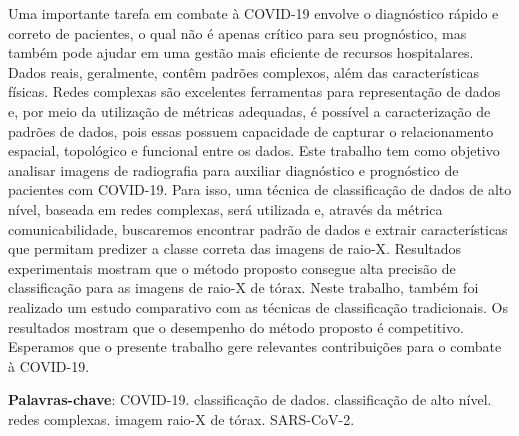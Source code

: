 \documentclass[
12pt,        %
oneside,     %
a4paper,     %
english,       %
brazil        %
%
%
]{ppgca}
\begin{document}

\setlength{\absparsep}{18pt} %
\begin{resumo}
\noindent
  Uma importante tarefa em combate à COVID-19 envolve o diagnóstico rápido e correto de pacientes, o qual não é apenas crítico para seu prognóstico, mas também pode ajudar em uma gestão mais eficiente de recursos hospitalares. Dados reais, geralmente, contêm padrões complexos, além das características físicas. Redes complexas são excelentes ferramentas para representação de dados e, por meio da utilização de métricas adequadas, é possível a caracterização de padrões de dados, pois essas possuem capacidade de capturar o relacionamento espacial, topológico e funcional entre os dados. Este trabalho tem como objetivo analisar imagens de radiografia para auxiliar diagnóstico e prognóstico de pacientes com COVID-19. Para isso, uma técnica de classificação de dados de alto nível, baseada em redes complexas, será utilizada e, através da métrica comunicabilidade, buscaremos encontrar padrão de dados e extrair características que permitam predizer a classe correta das imagens de raio-X. Resultados experimentais mostram que o método proposto consegue alta precisão de classificação para as imagens de raio-X de tórax. Neste trabalho, também foi realizado um estudo comparativo com as técnicas de classificação tradicionais. Os resultados mostram que o desempenho do método proposto é competitivo. Esperamos que o presente trabalho gere relevantes contribuições para o combate à COVID-19. 

\noindent \textbf{Palavras-chave}: COVID-19. classificação de dados. classificação de alto nível. redes complexas. imagem raio-X de tórax. SARS-CoV-2.
\end{resumo}
\end{document}
